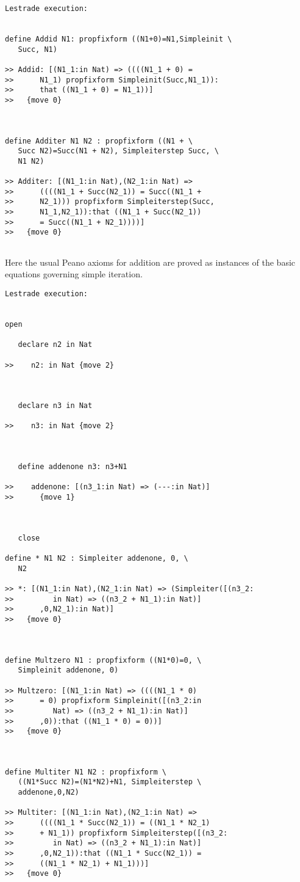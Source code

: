 \documentclass[12pt]{article}
\begin{document}
\begin{verbatim}Lestrade execution:


define Addid N1: propfixform ((N1+0)=N1,Simpleinit \
   Succ, N1)

>> Addid: [(N1_1:in Nat) => ((((N1_1 + 0) =
>>      N1_1) propfixform Simpleinit(Succ,N1_1)):
>>      that ((N1_1 + 0) = N1_1))]
>>   {move 0}



define Additer N1 N2 : propfixform ((N1 + \
   Succ N2)=Succ(N1 + N2), Simpleiterstep Succ, \
   N1 N2)

>> Additer: [(N1_1:in Nat),(N2_1:in Nat) =>
>>      ((((N1_1 + Succ(N2_1)) = Succ((N1_1 +
>>      N2_1))) propfixform Simpleiterstep(Succ,
>>      N1_1,N2_1)):that ((N1_1 + Succ(N2_1))
>>      = Succ((N1_1 + N2_1))))]
>>   {move 0}


\end{verbatim}

Here the usual Peano axioms for addition are proved as instances of the basic equations governing simple iteration.

\begin{verbatim}Lestrade execution:


open

   declare n2 in Nat

>>    n2: in Nat {move 2}



   declare n3 in Nat

>>    n3: in Nat {move 2}



   define addenone n3: n3+N1

>>    addenone: [(n3_1:in Nat) => (---:in Nat)]
>>      {move 1}



   close

define * N1 N2 : Simpleiter addenone, 0, \
   N2

>> *: [(N1_1:in Nat),(N2_1:in Nat) => (Simpleiter([(n3_2:
>>         in Nat) => ((n3_2 + N1_1):in Nat)]
>>      ,0,N2_1):in Nat)]
>>   {move 0}



define Multzero N1 : propfixform ((N1*0)=0, \
   Simpleinit addenone, 0)

>> Multzero: [(N1_1:in Nat) => ((((N1_1 * 0)
>>      = 0) propfixform Simpleinit([(n3_2:in
>>         Nat) => ((n3_2 + N1_1):in Nat)]
>>      ,0)):that ((N1_1 * 0) = 0))]
>>   {move 0}



define Multiter N1 N2 : propfixform \
   ((N1*Succ N2)=(N1*N2)+N1, Simpleiterstep \
   addenone,0,N2)

>> Multiter: [(N1_1:in Nat),(N2_1:in Nat) =>
>>      ((((N1_1 * Succ(N2_1)) = ((N1_1 * N2_1)
>>      + N1_1)) propfixform Simpleiterstep([(n3_2:
>>         in Nat) => ((n3_2 + N1_1):in Nat)]
>>      ,0,N2_1)):that ((N1_1 * Succ(N2_1)) =
>>      ((N1_1 * N2_1) + N1_1)))]
>>   {move 0}


\end{verbatim}
\end{document}
